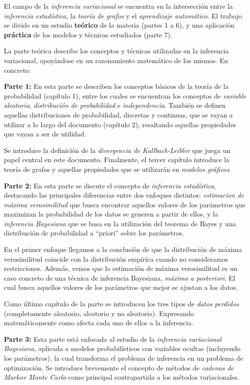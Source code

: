 
El campo de la \emph{inferencia variacional} se encuentra en la intersección entre la \emph{inferencia estadística}, la \emph{teoría de grafos} y el \emph{aprendizaje automático}. El trabajo se divide en un estudio \textbf{teórico} de la materia (partes 1 a 6), y una aplicación \textbf{práctica} de los modelos y técnicas estudiados (parte 7).

La parte teórica describe los conceptos y técnicas utilizadas en la inferencia variacional, apoyándose en un razonamiento matemático de los mismos. En concreto:

\textbf{Parte 1:} En esta parte se describen los conceptos básicos de la teoría de la probabilidad (capítulo 1), entre los cuales se encuentran los conceptos de \emph{variable aleatoria}, \emph{distribución de probabilidad} e \emph{independencia}. También se definen aquellas distribuciones de probabilidad, discretas y continuas, que se vayan a utilizar a lo largo del documento (capítulo 2), resaltando aquellas propiedades que vayan a ser de utilidad.

Se introduce la definición de la \emph{divergencia de Kullback-Leibler} que juega un papel central en este documento. Finalmente, el tercer capítulo introduce la teoría de grafos y aquellas propiedades que se utilizarán en \emph{modelos gráficos}.

\textbf{Parte 2:} En esta parte se discute el concepto de \emph{inferencia estadística}, destacando las principales diferencias entre dos enfoques distintos: \emph{estimacion de máxima verosimilitud} que busca encontrar aquellos valores de los parámetros que maximizan la probabilidad de los datos se generen a partir de ellos, y la \emph{inferencia Bayesiana} que se basa en la utilización del teorema de Bayes y una distribución de probabilidad a ``priori'' sobre los parámetros.

En el primer enfoque llegamos a la conclusión de que la distribución de máxima verosimilitud coincide con la distribución empírica cuando no consideramos restricciones. Además, vemos que la estimación de máxima verosimilitud es un caso concreto de una técnica de inferencia Bayesiana, \emph{máximo a posteriori}. El cual busca aquellos valores de los parámetros que mejor se ajustan a los datos.

Como último capítulo de la parte se introducen los tres tipos de \emph{datos perdidos} (completamente aleatorio, aleatorio y no aleatorio). Expresando matemáticamente como afecta cada uno de ellos a la inferencia.

\textbf{Parte 3:} Esta parte está enfocada al estudio de la \emph{inferencia variacional Bayesiana}, aplicada a modelos probabilísticos con variables ocultas (incluyendo los parámetros), la cual transforma el problema de inferencia en un problema de optimización. Se introduce brevemente el concepto de métodos de \emph{cadenas de Markov Monte Carlo} como principal contrapartida a los métodos variacionales.

